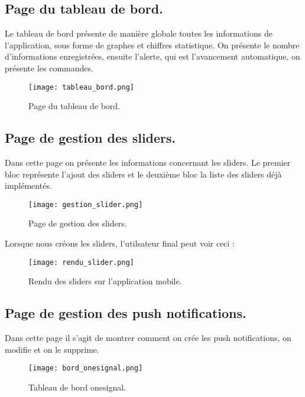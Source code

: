 \subsection{Page du tableau de bord.}

Le tableau de bord présente de manière globale toutes les informations de l’application, sous forme de graphes et chiffres statistique. On présente le nombre d’informations enregistrées, ensuite l’alerte, qui est l’avancement automatique, on présente les commandes.

\begin{figure}[H]
	\centering
	\texttt{[image: tableau\_bord.png]}
	\caption{Page du tableau de bord.}
	\label{fig:sp0}
\end{figure}

\subsection{Page de gestion des sliders.}

Dans cette page on présente les informations concernant les sliders. Le premier bloc représente l’ajout des sliders et le deuxième bloc la liste des sliders déjà implémentés.

\begin{figure}[H]
	\centering
	\texttt{[image: gestion\_slider.png]}
	\caption{Page de gestion des sliders.}
	\label{fig:sp0}
\end{figure}

Lorsque nous créons les sliders, l'utilsateur final peut voir ceci :

\begin{figure}[H]
	\centering
	\texttt{[image: rendu\_slider.png]}
	\caption{Rendu des sliders sur l'application mobile.}
	\label{fig:sp0}
\end{figure}

\subsection{Page de gestion des push notifications.}

Dans cette page il s’agit de montrer comment on crée les push notifications, on modifie et on le supprime.

\begin{figure}[H]
	\centering
	\texttt{[image: bord\_onesignal.png]}
	\caption{Tableau de bord onesignal.}
	\label{fig:sp0}
\end{figure}

